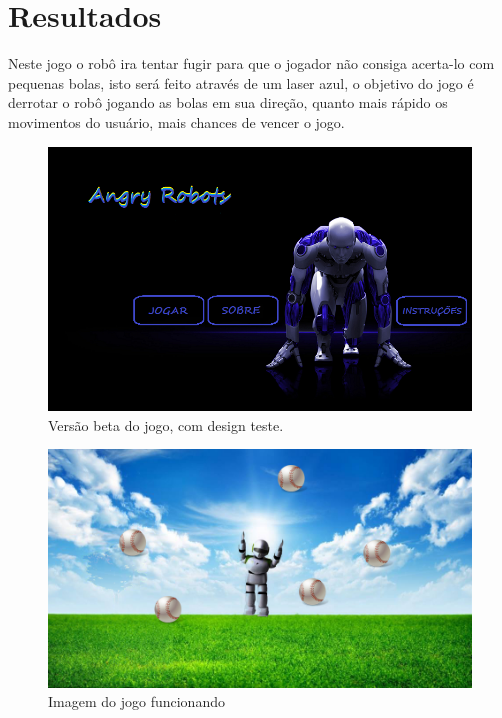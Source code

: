 \documentclass[12pt,openright,twoside,a4paper,brazil]{abntex2}
\begin{document}
\section*{Resultados}

Neste jogo o robô ira tentar fugir para que o jogador não consiga acerta-lo com pequenas bolas, 
isto será feito através de um laser azul, o objetivo do jogo é derrotar o robô jogando as bolas em sua direção, quanto mais rápido os movimentos do usuário, mais chances de vencer o jogo.

\vspace{0.5cm}

\begin{figure}[!htb]
\centering
\includegraphics[scale=0.4]{menu.png}
\caption{Versão beta do jogo, com design teste.}
\end{figure}

\vspace{0.5cm}

\begin{figure}[!htb]
\centering
\includegraphics[scale=0.3]{fundo.jpg}
\caption{Imagem do jogo funcionando}
\end{figure}
\end{document}
